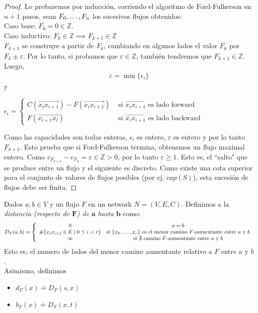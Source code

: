 \begin{proof}
Lo probaremos por inducción, corriendo el algoritmo de Ford-Fulkerson en $n+1$ pasos, sean $F_0, \mathellipsis, F_n$ los sucesivos flujos obtenidos:\\
Caso base: $F_0 = 0 \in \mathbb{Z}$.\\
Caso inductivo:
$F_k \in \mathbb{Z} \implies F_{k+1} \in \mathbb{Z}$\\
$F_{k+1}$ se construye a partir de $F_k$, cambiando en algunos lados el valor $F_k$ por $F_k \pm \varepsilon$. Por lo tanto, si probamos que $\varepsilon \in \mathbb{Z}$, también tendremos que $F_{k+1} \in \mathbb{Z}$. Luego,
\begin{align}
    \varepsilon = \min\{\epsilon_i\}
\end{align}
y \begin{center}
    $\epsilon_i = \begin{cases} C(\overrightarrow{x_i x_{i+1}}) - F(\overrightarrow{x_i x_{i+1}}) & \text{ si } \overrightarrow{x_i x_{i+1}} \text{ es lado forward}\\
    F(\overrightarrow{x_{i+1} x_i}) & \text{ si } \overrightarrow{x_i x_{i+1}} \text{ es lado backward}
    \end{cases}$
\end{center}
Como las capacidades son todas enteras, $\epsilon_i$ es entero, $\varepsilon$  es entero y por lo tanto $F_{k+1}$.
Esto prueba que si Ford-Fulkerson termina, obtenemos un flujo maximal entero.
Como $v_{F_{k+1}} - v_{F_k} = \varepsilon \in \mathbb{Z} > 0$, por lo tanto $\varepsilon \ge 1$. Esto es, el ``salto" que se produce entre un flujo y el siguiente es discreto.
Como existe una cota superior para el conjunto de valores de flujos posibles (por ej. $cap(S)$), esta sucesión de flujos debe ser finita. 
\end{proof}

\begin{definition}
Dados $a,b\in V$ y un flujo $F$ en un network $N = (V,E,C)$. Definimos a la \emph{distancia (respecto de $\boldsymbol{F}$) de $\boldsymbol{a}$ hasta $\boldsymbol{b}$} como:
\begin{align}
D_F(a,b) = \left\{
    \begin{array}{cc}
         0 & a = b\\
         \#\{x_i x_{i+1} \in E\mid 0\le i < r \}  &\text{si $\{x_0, \mathellipsis, x_r\}$ es el menor camino $F$-aumentante entre $a$ y $b$} \\ 
         \infty &\text{si $\nexists$ camino $F$-aumentante entre $a$ y $b$}
    \end{array}
    \right.
\end{align}
Esto es, el numero de lados del menor camino aumentante relativo a $F$ entre $a$ y $b$.\\
Asimismo, definimos
\begin{itemize}
    \item $d_F(x) \doteq D_F(s,x)$
    \item $b_F(x) \doteq D_F(x,t)$
\end{itemize}
\end{definition}

